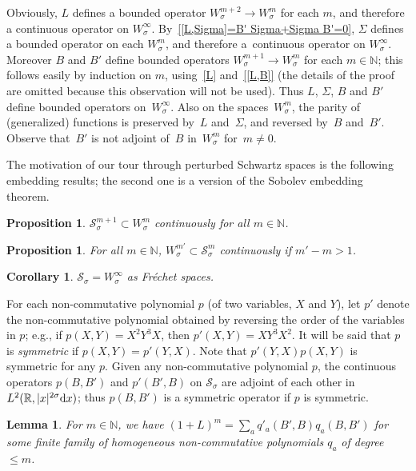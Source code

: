 \documentclass[pdftex]{sigma}
\newtheorem{Corollary}[Theorem]{Corollary}
\newtheorem{Lemma}[Theorem]{Lemma}
\newtheorem{Proposition}[Theorem]{Proposition}
{\theoremstyle{definition}
\newtheorem{Definition}[Theorem]{Definition}
\newtheorem{Note}[Theorem]{Note}
\newtheorem{Example}[Theorem]{Example}
\newtheorem{quest}[Theorem]{Question}
\newtheorem{Remark}[Theorem]{Remark}
\newtheorem{claim}{Claim}
}
\newcommand{\R}{\mathbb{R}}
\newcommand{\N}{\mathbb{N}}
\renewcommand{\SS}{\mathcal{S}}
\begin{document}
Obviously, $L$ def\/ines a bounded operator $W_\sigma^{m+2}\to W_\sigma^m$ for each $m$, and therefore a continuous operator on $W_\sigma^\infty$. By~\eqref{[L,Sigma]=B' Sigma+Sigma B'=0}, $\Sigma$ def\/ines a bounded operator on each $W_\sigma^m$, and therefore a~continuous operator on $W_\sigma^\infty$. Moreover $B$ and $B'$ def\/ine bounded operators $W_\sigma^{m+1}\to W_\sigma^m$ for each $m\in\N$; this follows easily by induction on $m$, using~\eqref{L} and~\eqref{[L,B]} (the details of the proof are omitted because this observation will not be used). Thus $L$, $\Sigma$, $B$ and $B'$ def\/ine bounded operators on~$W_\sigma^\infty$. Also on the spaces~$W_\sigma^m$, the parity of (generalized) functions is preserved by~$L$ and~$\Sigma$, and reversed by~$B$ and~$B'$. Observe that~$B'$ is not adjoint of~$B$ in~$W_\sigma^m$ for~$m\ne0$.


The motivation of our tour through perturbed Schwartz spaces is the following embedding results; the second one is a version of the Sobolev embedding theorem.

\begin{Proposition}\label{p:SS sigma,m' subset W sigma m}
  $\SS_\sigma^{m+1}\subset W_\sigma^m$ continuously for all $m\in\N$.
\end{Proposition}

\begin{Proposition}\label{p:Sobolev}
  For all $m\in\N$, $W_\sigma^{m'}\subset\SS_\sigma^m$ continuously if $m'-m>1$.
\end{Proposition}

\begin{Corollary}\label{c:Sobolev}
  $\SS_\sigma=W_\sigma^\infty$ as Fr\'echet spaces.
\end{Corollary}

For each non-commutative polynomial $p$ (of two variables, $X$ and $Y$), let $p'$ denote the non-commutative polynomial obtained by reversing the order of the variables in $p$; e.g., if $p(X,Y)=X^2Y^3X$, then $p'(X,Y)=XY^3X^2$. It will be said that $p$ is {\em symmetric\/} if $p(X,Y)=p'(Y,X)$. Note that $p'(Y,X)p(X,Y)$ is symmetric for any $p$. Given any non-commutative polynomial $p$, the continuous operators $p(B,B')$ and $p'(B',B)$ on $\SS_\sigma$ are adjoint of each other in $L^2(\R,|x|^{2\sigma}{\rm d}x)$; thus $p(B,B')$ is a symmetric operator if $p$ is symmetric.

\begin{Lemma}\label{l:(1+L) m}
  For $m\in\N$, we have $(1+L)^m=\sum_aq'_a(B',B)q_a(B,B')$ for some finite family of homogeneous non-commutative polynomials $q_a$ of degree $\le m$.
\end{Lemma}
\end{document}

